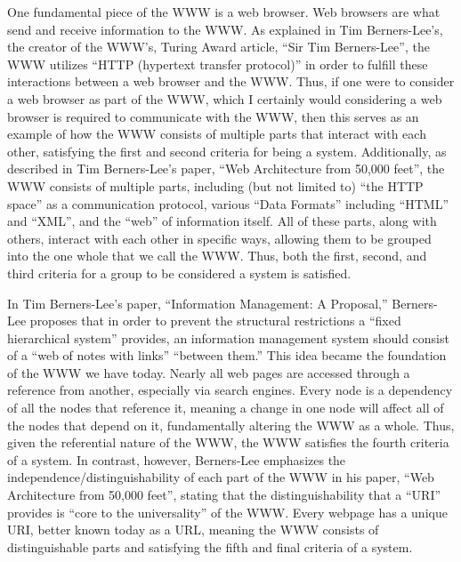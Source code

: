 \documentclass[11pt]{article}
\begin{document}
\par One fundamental piece of the WWW is a web browser. Web browsers are what send and receive information to the WWW. As explained in Tim Berners-Lee's, the creator of the WWW's, Turing Award article, ``Sir Tim Berners-Lee'', the WWW utilizes ``HTTP (hypertext transfer protocol)'' in order to fulfill these interactions between a web browser and the WWW.\cite{Haigh:2016} Thus, if one were to consider a web browser as part of the WWW, which I certainly would considering a web browser is required to communicate with the WWW, then this serves as an example of how the WWW consists of multiple parts that interact with each other, satisfying the first and second criteria for being a system. Additionally, as described in Tim Berners-Lee's paper, ``Web Architecture from 50,000 feet'', the WWW consists of multiple parts, including (but not limited to) ``the HTTP space'' as a communication protocol, various ``Data Formats'' including ``HTML'' and ``XML'', and the ``web'' of information itself.\cite{Berners-Lee:1998} All of these parts, along with others, interact with each other in specific ways, allowing them to be grouped into the one whole that we call the WWW. Thus, both the first, second, and third criteria for a group to be considered a system is satisfied.
\par In Tim Berners-Lee's paper, ``Information Management: A Proposal,'' Berners-Lee proposes that in order to prevent the structural restrictions a ``fixed hierarchical system'' provides, an information management system should consist of a ``web of notes with links'' ``between them.''\cite{Berners-Lee:1990} This idea became the foundation of the WWW we have today. Nearly all web pages are accessed through a reference from another, especially via search engines. Every node is a dependency of all the nodes that reference it, meaning a change in one node will affect all of the nodes that depend on it, fundamentally altering the WWW as a whole. Thus, given the referential nature of the WWW, the WWW satisfies the fourth criteria of a system. 
In contrast, however, Berners-Lee emphasizes the independence/distinguishability of each part of the WWW in his paper, ``Web Architecture from 50,000 feet'', stating that the distinguishability that a ``URI'' provides is ``core to the universality'' of the WWW.\cite{Berners-Lee:1998} Every webpage has a unique URI, better known today as a URL, meaning the WWW consists of distinguishable parts and satisfying the fifth and final criteria of a system.
\end{document}
